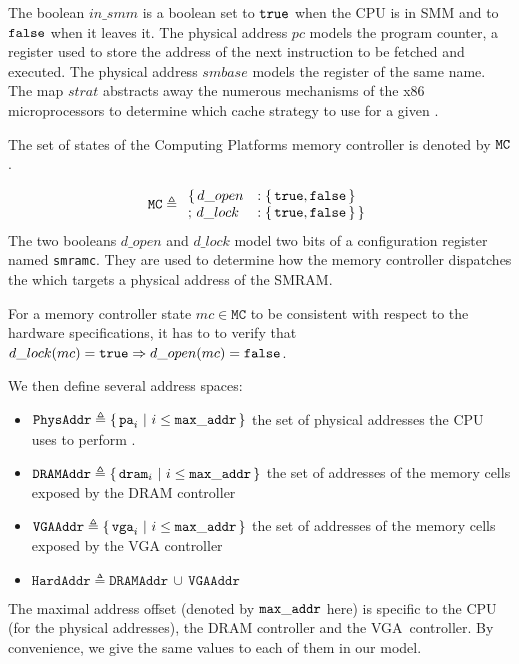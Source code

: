 The boolean $in\_smm$ is a boolean set to $\mathtt{true}$ when the CPU is in
SMM and to $\mathtt{false}$ when it leaves it. The physical address $pc$ models the
program counter, a register used to store the address of the next instruction to
be fetched and executed. The physical address $smbase$ models the register of
the same name. The map $strat$ abstracts away the numerous mechanisms of the x86
microprocessors to determine which cache strategy to use for a given \IO.

The set of states of the  Computing Platforms memory
controller is denoted by $\mathtt{MC}$.

\[ \texttt{MC} \triangleq \begin{array}{ll}
                              \{\,d\_open &: \{\,\mathtt{true},
                              \mathtt{false}\,\} \\
                              ;\,d\_lock &: \{\,\mathtt{true},
                          \mathtt{false}\,\}\,\}
                            \end{array} \]
The two booleans $d\_open$ and $d\_lock$ model two bits of a configuration
register named \texttt{smramc}. They are used to determine how the memory
controller dispatches the \IO which targets a physical address of the SMRAM.

For a memory controller state $mc \in \texttt{MC}$ to be consistent with respect
to the hardware specifications, it has to to verify that $d\_lock(mc) =
\mathtt{true} \Rightarrow d\_open(mc) = \mathtt{false}$.

We then define several address spaces:
\begin{itemize}
  \item $\texttt{PhysAddr} \triangleq \{\,\mathtt{pa}_i\ |\ i \leq
    \mathtt{max\_addr}\,\}$ the set of physical addresses the CPU uses to perform \IO.
  \item $\texttt{DRAMAddr} \triangleq \{\,\mathtt{dram}_i\ |\ i \leq
    \mathtt{max\_addr}\,\}$ the set of addresses of the memory cells exposed by the
    DRAM controller
  \item $\texttt{VGAAddr} \triangleq \{\,\mathtt{vga}_i\ |\ i \leq
    \mathtt{max\_addr}\,\}$ the set of addresses of the memory cells exposed by the
    VGA controller
  \item $\texttt{HardAddr} \triangleq \texttt{DRAMAddr}\,\cup\,\texttt{VGAAddr}$
\end{itemize}

The maximal address offset (denoted by $\mathtt{max\_addr}$ here) is specific to the
CPU (for the physical addresses), the DRAM controller and the VGA controller. By
convenience, we give the same values to each of them in our model.

